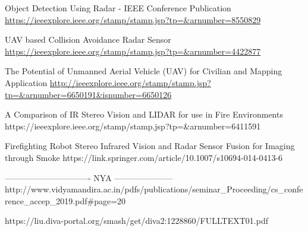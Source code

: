 
Object Detection Using Radar - IEEE Conference Publication
\url{https://ieeexplore.ieee.org/stamp/stamp.jsp?tp=&arnumber=8550829}

UAV based Collision Avoidance Radar Sensor 
\url{https://ieeexplore.ieee.org/stamp/stamp.jsp?tp=&arnumber=4422877}

The Potential of Unmanned Aerial Vehicle (UAV) for Civilian and Mapping Application
\url{http://ieeexplore.ieee.org/stamp/stamp.jsp?tp=&arnumber=6650191&isnumber=6650126}

A Comparison of IR Stereo Vision and LIDAR for use
in Fire Environments 
https://ieeexplore.ieee.org/stamp/stamp.jsp?tp=&arnumber=6411591


Firefighting Robot Stereo Infrared Vision and Radar Sensor Fusion for Imaging through Smoke
https://link.springer.com/article/10.1007/s10694-014-0413-6


------------------------------- NYA ---------------------
http://www.vidyamandira.ac.in/pdfs/publications/seminar_Proceeding/cs_conference_accep_2019.pdf#page=20

https://liu.diva-portal.org/smash/get/diva2:1228860/FULLTEXT01.pdf
